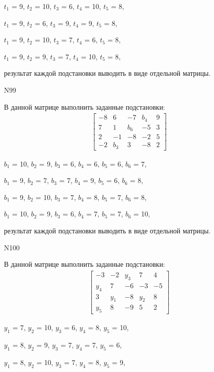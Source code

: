\documentclass[11pt]{report}
\begin{document}
$t_{1}$ = 9, $t_{2}$ = 10, $t_{3}$ = 6, $t_{4}$ = 10, $t_{5}$ = 8, 

$t_{1}$ = 9, $t_{2}$ = 6, $t_{3}$ = 9, $t_{4}$ = 9, $t_{5}$ = 8, 

$t_{1}$ = 9, $t_{2}$ = 10, $t_{3}$ = 7, $t_{4}$ = 6, $t_{5}$ = 8, 

$t_{1}$ = 9, $t_{2}$ = 9, $t_{3}$ = 7, $t_{4}$ = 10, $t_{5}$ = 8, 

результат каждой подстановки выводить в виде отдельной матрицы.

N99

В данной матрице выполнить заданные подстановки:
\begin{align*}
\left[\begin{matrix}-8 & 6 & -7 & b_{4} & 9\\7 & 1 & b_{6} & -5 & 3\\2 & -1 & -8 & -2 & 5\\-2 & b_{3} & 3 & -8 & 2\end{matrix}\right]
\end{align*}


$b_{1}$ = 10, $b_{2}$ = 9, $b_{3}$ = 6, $b_{4}$ = 6, $b_{5}$ = 6, $b_{6}$ = 7, 

$b_{1}$ = 9, $b_{2}$ = 7, $b_{3}$ = 7, $b_{4}$ = 9, $b_{5}$ = 6, $b_{6}$ = 8, 

$b_{1}$ = 9, $b_{2}$ = 10, $b_{3}$ = 7, $b_{4}$ = 8, $b_{5}$ = 7, $b_{6}$ = 8, 

$b_{1}$ = 10, $b_{2}$ = 9, $b_{3}$ = 6, $b_{4}$ = 7, $b_{5}$ = 7, $b_{6}$ = 10, 

результат каждой подстановки выводить в виде отдельной матрицы.

N100

В данной матрице выполнить заданные подстановки:
\begin{align*}
\left[\begin{matrix}-3 & -2 & y_{3} & 7 & 4\\y_{4} & 7 & -6 & -3 & -5\\3 & y_{1} & -8 & y_{2} & 8\\y_{5} & 8 & -9 & 5 & 2\end{matrix}\right]
\end{align*}


$y_{1}$ = 7, $y_{2}$ = 10, $y_{3}$ = 6, $y_{4}$ = 8, $y_{5}$ = 10, 

$y_{1}$ = 8, $y_{2}$ = 9, $y_{3}$ = 7, $y_{4}$ = 7, $y_{5}$ = 6, 

$y_{1}$ = 8, $y_{2}$ = 10, $y_{3}$ = 7, $y_{4}$ = 8, $y_{5}$ = 9, 
\end{document}

